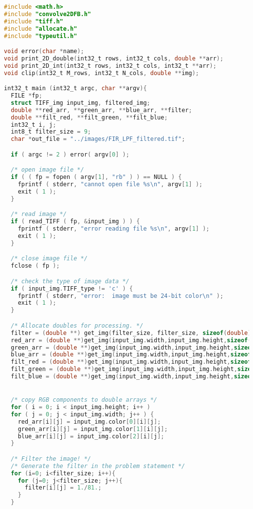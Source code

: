 \documentclass{article}
\begin{document}
\begin{lstlisting}[language=C, caption=filter\_image\_section3.c, label={lst:sec3}]
#include <math.h>
#include "convolve2DFB.h"
#include "tiff.h"
#include "allocate.h"
#include "typeutil.h"

void error(char *name);
void print_2D_double(int32_t rows, int32_t cols, double **arr);
void print_2D_int(int32_t rows, int32_t cols, int32_t **arr);
void clip(int32_t M_rows, int32_t N_cols, double **img);

int32_t main (int32_t argc, char **argv){
  FILE *fp;
  struct TIFF_img input_img, filtered_img;
  double **red_arr, **green_arr, **blue_arr, **filter;
  double **filt_red, **filt_green, **filt_blue;
  int32_t i, j;
  int8_t filter_size = 9;
  char *out_file = "../images/FIR_LPF_filtered.tif";

  if ( argc != 2 ) error( argv[0] );

  /* open image file */
  if ( ( fp = fopen ( argv[1], "rb" ) ) == NULL ) {
    fprintf ( stderr, "cannot open file %s\n", argv[1] );
    exit ( 1 );
  }

  /* read image */
  if ( read_TIFF ( fp, &input_img ) ) {
    fprintf ( stderr, "error reading file %s\n", argv[1] );
    exit ( 1 );
  }

  /* close image file */
  fclose ( fp );

  /* check the type of image data */
  if ( input_img.TIFF_type != 'c' ) {
    fprintf ( stderr, "error:  image must be 24-bit color\n" );
    exit ( 1 );
  }

  /* Allocate doubles for processing. */
  filter = (double **) get_img(filter_size, filter_size, sizeof(double));
  red_arr = (double **)get_img(input_img.width,input_img.height,sizeof(double));
  green_arr = (double **)get_img(input_img.width,input_img.height,sizeof(double));
  blue_arr = (double **)get_img(input_img.width,input_img.height,sizeof(double));
  filt_red = (double **)get_img(input_img.width,input_img.height,sizeof(double));
  filt_green = (double **)get_img(input_img.width,input_img.height,sizeof(double));
  filt_blue = (double **)get_img(input_img.width,input_img.height,sizeof(double));


  /* copy RGB components to double arrays */
  for ( i = 0; i < input_img.height; i++ )
  for ( j = 0; j < input_img.width; j++ ) {
    red_arr[i][j] = input_img.color[0][i][j];
    green_arr[i][j] = input_img.color[1][i][j];
    blue_arr[i][j] = input_img.color[2][i][j];
  }

  /* Filter the image! */
  /* Generate the filter in the problem statement */
  for (i=0; i<filter_size; i++){
    for (j=0; j<filter_size; j++){
      filter[i][j] = 1./81.;
    }
  }


\end{lstlisting}
\end{document}
